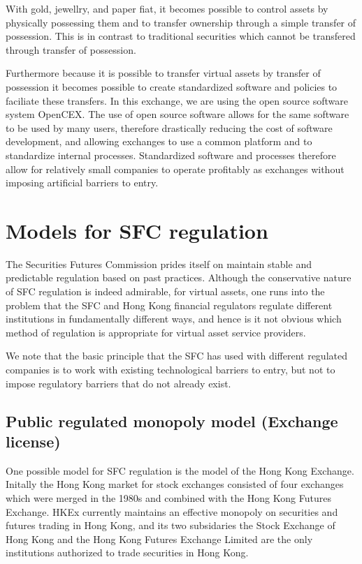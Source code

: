 With gold, jewellry, and paper fiat, it becomes possible to control
assets by physically possessing them and to transfer ownership through
a simple transfer of possession.  This is in contrast to traditional
securities which cannot be transfered through transfer of possession.

Furthermore because it is possible to transfer virtual assets by
transfer of possession it becomes possible to create standardized
software and policies to faciliate these transfers.  In this exchange,
we are using the open source software system OpenCEX.  The use of open
source software allows for the same software to be used by many users,
therefore drastically reducing the cost of software development, and
allowing exchanges to use a common platform and to standardize
internal processes.  Standardized software and processes therefore
allow for relatively small companies to operate profitably as
exchanges without imposing artificial barriers to entry.

\section{Models for SFC regulation}
The Securities Futures Commission prides itself on maintain stable and
predictable regulation based on past practices.  Although the
conservative nature of SFC regulation is indeed admirable, for virtual
assets, one runs into the problem that the SFC and Hong Kong financial
regulators regulate different institutions in fundamentally different
ways, and hence is it not obvious which method of regulation is
appropriate for virtual asset service providers.

We note that the basic principle that the SFC has used with different
regulated companies is to work with existing technological barriers to
entry, but not to impose regulatory barriers that do not already
exist.

\subsection{Public regulated monopoly model (Exchange license)}
One possible model for SFC regulation is the model of the Hong Kong
Exchange.  Initally the Hong Kong market for stock exchanges consisted
of four exchanges which were merged in the 1980s and combined with the
Hong Kong Futures Exchange.  HKEx currently maintains an effective
monopoly on securities and futures trading in Hong Kong, and its two
subsidaries the Stock Exchange of Hong Kong and the Hong Kong Futures
Exchange Limited are the only institutions authorized to trade
securities in Hong Kong.

